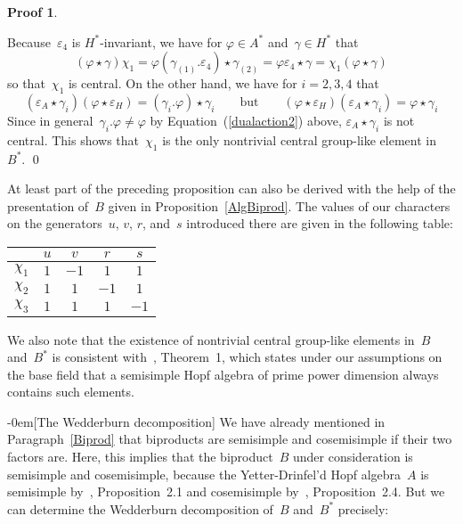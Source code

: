 \documentclass{article}
\makeatletter
\renewcommand{\subsection}{\@startsection{subsection}{2}{0em}%
{\baselineskip}{-0em}{\bfseries\normalsize}}
\newcounter{num}
\newenvironment{pflist}{\begin{list}{(\arabic{num})}{\usecounter{num} \leftmargin0cm \itemindent5pt}}{\end{list}}
\newcounter{num1}
\numberwithin{equation}{section}
\theoremstyle{definition}
\newtheorem*{pf}{Proof}
\theoremstyle{break}
\newcommand{\1}{{(1)}}
\newcommand{\2}{{(2)}}
\newcommand{\3}{{(3)}}
\newcommand{\ea}{{\varepsilon_{A}}}
\newcommand{\eh}{{\varepsilon_{H}}}
\newcommand{\el}{{\varepsilon}}
\makeatother
\begin{document}
\begin{pf}
\begin{pflist}
\item
Because~$\el_4$ is $H^*$-invariant, we have for $\varphi \in A^*$ and~$\gamma \in H^*$ that
\[(\varphi \star \gamma) \chi_1 = \varphi (\gamma_\1.\el_4) \star \gamma_\2
= \varphi \el_4 \star \gamma = \chi_1 (\varphi \star \gamma) \]
so that~$\chi_1$ is central. On the other hand, we have for  $i= 2, 3, 4$ that
\[(\ea \star \gamma_i) (\varphi \star \eh) =  (\gamma_i.\varphi) \star \gamma_i
\qquad \text{but} \qquad (\varphi \star \eh) (\ea \star \gamma_i) = \varphi \star \gamma_i \]
Since in general~$\gamma_i.\varphi \neq \varphi$ by Equation~(\ref{dualaction2}) above,
$\ea \star \gamma_i$ is not central. This shows that~$\chi_1$ is the only nontrivial central group-like element in~$B^*$.
\qed
\end{pflist}
\end{pf}

At least part of the preceding proposition can also be derived with the help of the presentation of~$B$ given in Proposition~\ref{AlgBiprod}. The values of our characters on the generators~$u$, $v$, $r$, and~$s$ introduced there are given in the following table:
\begin{center}
\renewcommand\arraystretch{1.5}
\begin{tabular}{|c|c|c|c|c|} \hline
& $u$ & $v$ & $r$ & $s$ \\ \hline
$\chi_1$ & $1$ & $-1$ & $1$ & $1$ \\ \hline
$\chi_2$ & $1$ & $1$ & $-1$ & $1$ \\ \hline
$\chi_3$ & $1$ & $1$ & $1$ & $-1$ \\ \hline
\end{tabular}
\end{center}

We also note that the existence of nontrivial central group-like elements in~$B$ and~$B^*$ is consistent with~\cite{MaPn}, Theorem~1, which states under our assumptions on the base field that a semisimple Hopf algebra of prime power dimension always contains such elements.


\subsection[The Wedderburn decomposition]{} \label{Wedderb}
We have already mentioned in Paragraph~\ref{Biprod} that biproducts are semisimple and cosemisimple if their two factors are. Here, this implies that the biproduct~$B$ under consideration is semisimple and cosemisimple, because the Yetter-Drinfel'd Hopf algebra~$A$ is semisimple by~\cite{KaSo2}, Proposition~2.1 and cosemisimple by~\cite{KaSo2}, Proposition~2.4. But we can determine the Wedderburn decomposition of~$B$ and~$B^*$ precisely:
\end{document}
